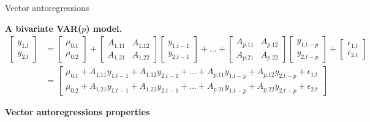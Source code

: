 \documentclass[notes,blackandwhite,mathsans,usenames,dvipsnames]{beamer}
\begin{document}
\begin{frame}{Vector autoregressions}

\textbf{A bivariate VAR($p$) model.}\footnotesize
\begin{align*} 
\begin{bmatrix} y_{1.t} \\ y_{2.t} \end{bmatrix}
&= \begin{bmatrix} \mu_{0.1} \\ \mu_{0.2} \end{bmatrix} + \begin{bmatrix} A_{1.11} & A_{1.12} \\ A_{1.21} & A_{1.22} \end{bmatrix}  \begin{bmatrix} y_{1.t-1} \\ y_{2.t-1} \end{bmatrix} + \dots
+ \begin{bmatrix} A_{p.11} & A_{p.12} \\ A_{p.21} & A_{p.22}   \end{bmatrix} \begin{bmatrix} y_{1.t-p} \\ y_{2.t-p} \end{bmatrix} + \begin{bmatrix} \epsilon_{1.t} \\ \epsilon_{2.t}  \end{bmatrix}\\[2ex]
&= \begin{bmatrix} 
\mu_{0.1}  + A_{1.11} y_{1.t-1} +  A_{1.12}y_{2.t-1} + \dots + A_{p.11}y_{1.t-p} + A_{p.12}y_{2.t-p} + \epsilon_{1.t}\\ 
\mu_{0.2} + A_{1.21}y_{1.t-1} + A_{1.22}y_{2.t-1} + \dots + A_{p.21}y_{1.t-p} + A_{p.22}y_{2.t-p}+ \epsilon_{2.t}
\end{bmatrix} 
\end{align*} 

\end{frame}





{
\begin{frame}

\begin{adjustwidth}{-0.5cm}{0cm}
\vspace{8.3cm}\Large
\textbf{{\color{mcxs1}Vector autoregressions} {\color{mcxs2}properties}}
\end{adjustwidth}

\end{frame}
}
\end{document}
